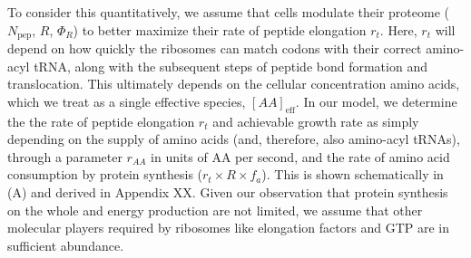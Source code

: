 
To consider this quantitatively, we assume that cells modulate their proteome
($N_\text{pep}$, $R$, $\Phi_R$) to better maximize their rate of peptide
elongation $r_t$. Here, $r_t$ will depend on how quickly the ribosomes can
match codons with their correct amino-acyl tRNA, along with the subsequent steps
of peptide bond formation and translocation. This ultimately depends on the
cellular concentration amino acids, which we treat as a single effective
species, $[AA]_\text{eff}$. In our model, we determine the the rate of peptide
elongation $r_t$ and achievable growth rate as simply depending on the supply of
amino acids (and, therefore, also amino-acyl tRNAs), through a parameter
$r_{AA}$ in units of AA per second, and the rate of amino acid consumption by
protein synthesis ($r_t \times R \times f_a$). This is shown schematically in
(A) and derived in Appendix XX. Given our observation
that protein synthesis on the whole and energy production are not limited, we
assume that other molecular players required by ribosomes like elongation
factors and GTP are in sufficient abundance.

%

